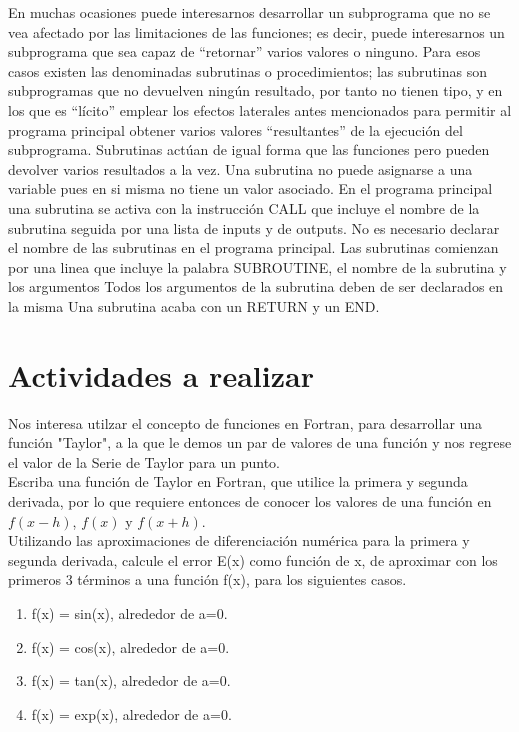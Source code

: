 \documentclass[12pt,a4paper,openright]{article}
\begin{document}
En muchas ocasiones puede interesarnos desarrollar un subprograma que no se vea afectado por las
limitaciones de las funciones; es decir, puede interesarnos un subprograma que sea capaz de “retornar” varios valores o
ninguno. Para esos casos existen las denominadas subrutinas o procedimientos; las subrutinas son subprogramas que
no devuelven ningún resultado, por tanto no tienen tipo, y en los que es “lícito” emplear los efectos laterales antes
mencionados para permitir al programa principal obtener varios valores “resultantes” de la ejecución del subprograma.
Subrutinas actúan de igual forma que las funciones pero pueden devolver varios resultados a la vez. Una subrutina no puede asignarse a una variable pues en si misma no tiene un valor asociado.
En el programa principal una subrutina se activa con la instrucción CALL que incluye el nombre de la subrutina seguida por una lista de inputs y de outputs.
No es necesario declarar el nombre de las subrutinas en el programa principal.
Las subrutinas comienzan por una linea que incluye la palabra SUBROUTINE, el nombre de la subrutina y los argumentos
Todos los argumentos de la subrutina deben de ser declarados en la misma
Una subrutina acaba con un RETURN y un END.


\section*{Actividades a realizar}


Nos interesa utilzar el concepto de funciones en Fortran, para desarrollar una función "Taylor", a la que le demos un par de valores de una función y nos regrese el valor de la Serie de Taylor para un punto.\\

Escriba una función de Taylor en Fortran, que utilice la primera y segunda derivada, por lo que requiere entonces de conocer los valores de una función en $f(x-h)$, $f(x)$  y $f(x+h)$. \\

Utilizando las aproximaciones de diferenciación numérica para la primera y segunda derivada, calcule el error E(x) como función de x, de aproximar con los primeros 3 términos a una función f(x), para los siguientes casos. \\

\begin{enumerate}

\item f(x) = sin(x), alrededor de a=0.
\item f(x) = cos(x), alrededor de a=0.
\item f(x) = tan(x), alrededor de a=0.
\item f(x) = exp(x), alrededor de a=0.

\end{enumerate}
 
\end{document}
